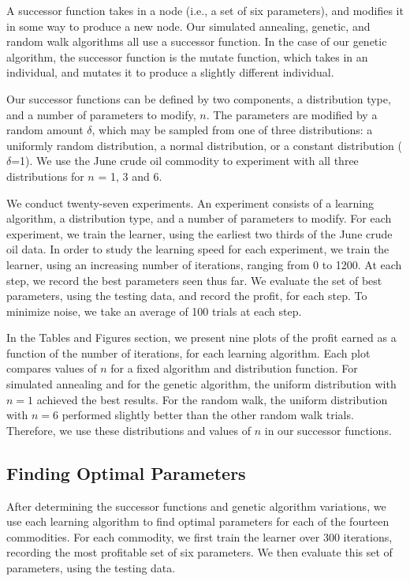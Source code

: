\documentclass[12pt]{article}
\begin{document}
A successor function takes in a node (i.e., a set of six parameters), and
modifies it in some way to produce a new node.  Our simulated annealing,
genetic, and random walk algorithms all use a successor function.  In the case
of our genetic algorithm, the successor function is the mutate function, which
takes in an individual, and mutates it to produce a slightly different
individual.

Our successor functions can be defined by two components, a distribution type,
and a number of parameters to modify, $n$. The parameters are modified by a
random amount $\delta$, which may be sampled from one of three distributions: a
uniformly random distribution, a normal distribution, or a constant distribution
($\delta$=1). We use the June crude oil commodity to experiment with all three
distributions for $n$ = 1, 3 and 6.

We conduct twenty-seven experiments. An experiment consists of a learning
algorithm, a distribution type, and a number of parameters to modify. For each
experiment, we train the learner, using the earliest two thirds of the June
crude oil data. In order to study the learning speed for each experiment, we
train the learner, using an increasing number of iterations, ranging from 0 to
1200.  At each step, we record the best parameters seen thus far.  We evaluate
the set of best parameters, using the testing data, and record the profit, for
each step. To minimize noise, we take an average of 100 trials at each step.

In the Tables and Figures section, we present nine plots of the profit earned as
a function of the number of iterations, for each learning algorithm.  Each plot
compares values of $n$ for a fixed algorithm and distribution function.  For
simulated annealing and for the genetic algorithm, the uniform distribution with
$n = 1$ achieved the best results.  For the random walk, the uniform
distribution with $n = 6$ performed slightly better than the other random walk
trials.  Therefore, we use these distributions and values of $n$ in our
successor functions.

\subsection{Finding Optimal Parameters}

After determining the successor functions and genetic algorithm variations, we
use each learning algorithm to find optimal parameters for each of the fourteen
commodities. For each commodity, we first train the learner over 300 iterations,
recording the most profitable set of six parameters. We then evaluate this set
of parameters, using the testing data.
\end{document}
